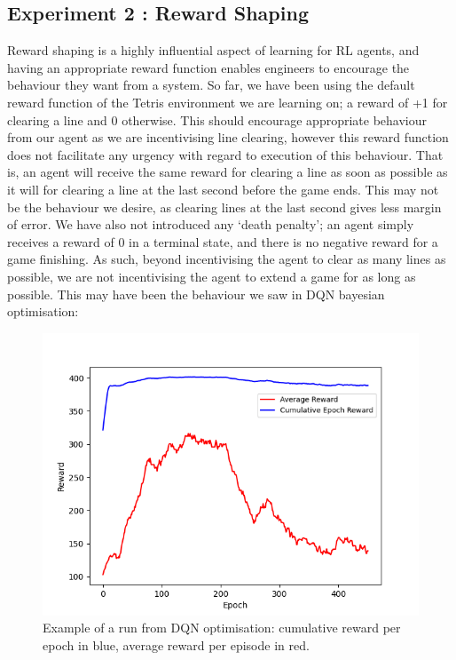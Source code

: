 \documentclass[12pt]{article}
\begin{document}
\subsection{Experiment 2 : Reward Shaping}
Reward shaping \autocite{ng1999policy} is a highly influential aspect of learning for RL agents, and having an appropriate reward function enables engineers to encourage the behaviour they want from a system. So far, we have been using the default reward function of the Tetris environment we are learning on; a reward of +1 for clearing a line and 0 otherwise. This should encourage appropriate behaviour from our agent as we are incentivising line clearing, however this reward function does not facilitate any urgency with regard to execution of this behaviour. That is, an agent will receive the same reward for clearing a line as soon as possible as it will for clearing a line at the last second before the game ends. This may not be the behaviour we desire, as clearing lines at the last second gives less margin of error. We have also not introduced any `death penalty'; an agent simply receives a reward of 0 in a terminal state, and there is no negative reward for a game finishing. As such, beyond incentivising the agent to clear as many lines as possible, we are not incentivising the agent to extend a game for as long as possible. This may have been the behaviour we saw in DQN bayesian optimisation:
\begin{figure}[H]
    \centering
    \includegraphics[scale=0.7]{20.png}
    \caption{Example of a run from DQN optimisation: cumulative reward per epoch in blue, average reward per episode in red.}
    \label{dqnopty}
\end{figure}
\end{document}
